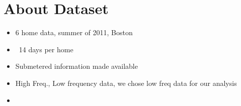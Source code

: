 \documentclass[conference]{IEEEtran}
\begin{document}
%
%


%



\section{About Dataset}
\begin{itemize}
\item 6 home data, summer of 2011, Boston
\item ~14 days per home
\item Submetered information made available
\item High Freq., Low frequency data, we chose low freq data for our analysis
\item 
\end{itemize}
\end{document}
